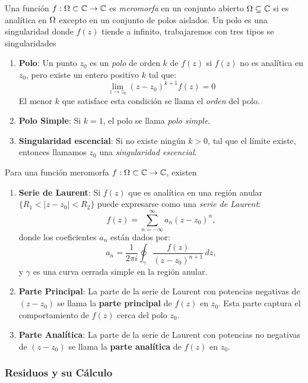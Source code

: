 \documentclass[main.tex]{subfiles}
\begin{document}
\begin{def.}
\noindent Una función \(f:\Omega\subset\mathbb C \to\mathbb C \) es \emph{meromorfa} en un conjunto abierto \(\Omega \subseteq \mathbb{C}\) si es analítica en \(\Omega\) excepto en un conjunto de polos aislados. Un polo es una singularidad donde \(f(z)\) tiende a infinito, trabajaremos con tres tipos se singularidades

\begin{enumerate}
\item \textbf{Polo}:
Un punto \(z_0\) es un \emph{polo} de orden \(k\) de \(f(z)\) si \(f(z)\) no es analítica en \(z_0\), pero existe un entero positivo \(k\) tal que:
\[
\lim_{z \to z_0} (z - z_0)^{k+1} f(z)=0
\]
El menor \(k\) que satisface esta condición se llama el \emph{orden} del polo.

\item \textbf{Polo Simple}: Si \(k = 1\), el polo se llama \emph{polo simple}.

\item \textbf{Singularidad escencial}: Si no existe  ningún \(k > 0\), tal que el límite existe, entonces llamamos \(z_0\) una \emph{singularidad escencial}.
\end{enumerate}
\end{def.}

\begin{teorema}
Para una función meromorfa \(f:\Omega\subset\mathbb C \to\mathbb C \), existen
\begin{enumerate}
\item \textbf{Serie de Laurent}:
Si \(f(z)\) que es analítica en una región anular \(\{R_1 < |z - z_0| < R_2\}\) puede expresarse como una \emph{serie de Laurent}:
\[
f(z) = \sum_{n=-\infty}^\infty a_n (z - z_0)^n,
\]
donde los coeficientes \(a_n\) están dados por:
\[
a_n = \frac{1}{2\pi i} \oint_\gamma \frac{f(z)}{(z - z_0)^{n+1}} \, dz,
\]
y \(\gamma\) es una curva cerrada simple en la región anular.

\item \textbf{Parte Principal}:
La parte de la serie de Laurent con potencias negativas de \((z - z_0)\) se llama la \textbf{parte principal} de \(f(z)\) en \(z_0\). Esta parte captura el comportamiento de \(f(z)\) cerca del polo \(z_0\).

\item \textbf{Parte Analítica}:
La parte de la serie de Laurent con potencias no negativas de \((z - z_0)\) se llama la \textbf{parte analítica} de \(f(z)\) en \(z_0\).
\end{enumerate}
\end{teorema}
\noindent\subsubsection{Residuos y su Cálculo}
\end{document}
